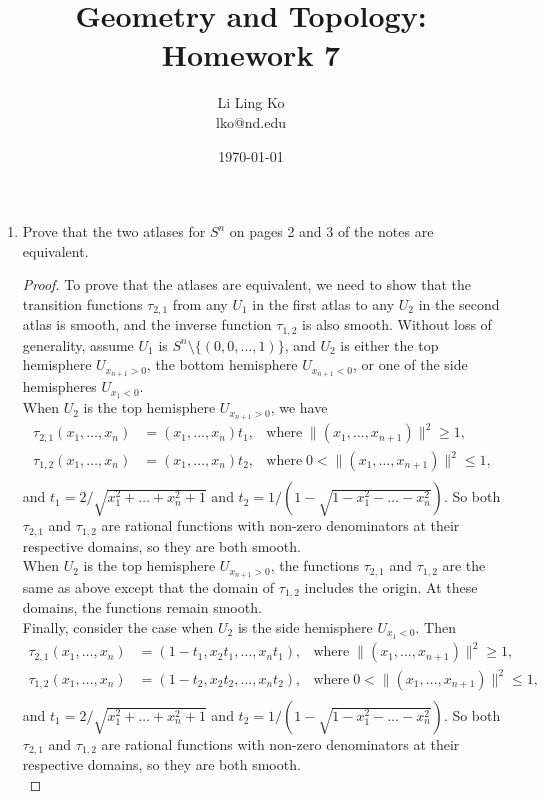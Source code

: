 \documentclass{article}
\begin{document}
\title{Geometry and Topology: Homework 7}
\author{Li Ling Ko\\ lko@nd.edu}
\date{\today}
\maketitle

\begin{enumerate}[label={\bf Q\arabic*:}]
  \item Prove that the two atlases for $S^n$ on pages 2 and 3 of the notes
    are equivalent.

    \begin{proof}
      To prove that the atlases are equivalent, we need to show that the
      transition functions $\tau_{2,1}$ from any $U_1$ in the first atlas
      to any $U_2$ in the second atlas is smooth, and the inverse function
      $\tau_{1,2}$ is also smooth. Without loss of generality, assume $U_1$
      is $S^n\setminus\{(0,0,\ldots,1)\}$, and $U_2$ is either the top
      hemisphere $U_{x_{n+1}>0}$, the bottom hemisphere $U_{x_{n+1}<0}$, or
      one of the side hemispheres $U_{x_1<0}$. \\

      When $U_2$ is the top hemisphere $U_{x_{n+1}>0}$, we have
      \begin{align*}
        \tau_{2,1}(x_1,\ldots,x_{n}) &= (x_1,\ldots,x_{n})t_1, &
        \text{where}\; \|(x_1,\ldots,x_{n+1})\|^2\geq1, \\
        \tau_{1,2}(x_1,\ldots,x_{n}) &= (x_1,\ldots,x_{n})t_2, &
        \text{where}\; 0<\|(x_1,\ldots,x_{n+1})\|^2\leq1, \\
      \end{align*}
      and $t_1=2/\sqrt{x_1^2+\ldots+x_{n}^2+1}$ and
      $t_2=1/(1-\sqrt{1-x_1^2-\ldots-x_{n}^2})$. So both $\tau_{2,1}$ and
      $\tau_{1,2}$ are rational functions with non-zero denominators at
      their respective domains, so they are both smooth. \\

      When $U_2$ is the top hemisphere $U_{x_{n+1}>0}$, the functions
      $\tau_{2,1}$ and $\tau_{1,2}$ are the same as above
      except that the domain of $\tau_{1,2}$ includes the origin. At these
      domains, the functions remain smooth. \\

      Finally, consider the case when $U_2$ is the side hemisphere
      $U_{x_1<0}$. Then
      \begin{align*}
        \tau_{2,1}(x_1,\ldots,x_{n}) &= (1-t_1,x_2t_1,\ldots,x_{n}t_1), &
        \text{where}\; \|(x_1,\ldots,x_{n+1})\|^2\geq1, \\
        \tau_{1,2}(x_1,\ldots,x_{n}) &= (1-t_2,x_2t_2,\ldots,x_{n}t_2), &
        \text{where}\; 0<\|(x_1,\ldots,x_{n+1})\|^2\leq1, \\
      \end{align*}
      and $t_1=2/\sqrt{x_1^2+\ldots+x_{n}^2+1}$ and
      $t_2=1/(1-\sqrt{1-x_1^2-\ldots-x_{n}^2})$. So both $\tau_{2,1}$ and
      $\tau_{1,2}$ are rational functions with non-zero denominators at
      their respective domains, so they are both smooth. \\
    \end{proof}


\end{enumerate}
\end{document}
